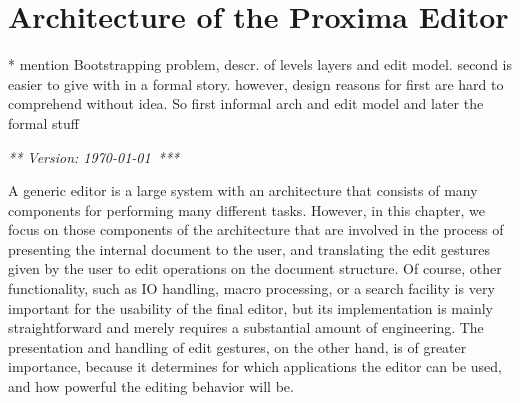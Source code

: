 \chapter{Architecture of the Proxima Editor}
\label{chap:proxArch}












* mention Bootstrapping problem, descr. of levels layers and edit model. second is easier to give with in a formal story. however, design reasons for first are hard to comprehend without idea. So first informal arch and edit model and later the formal stuff

{\em *** Version: \today~***}


A generic editor is a large system with an architecture that consists of many components for performing many different tasks. However, in this chapter, we focus on those components of the architecture that are involved in the process of presenting the internal document to the user, and translating the edit gestures given by the user to edit operations on the document structure. Of course, other functionality, such as IO handling, macro processing, or a search facility is very important for the usability of the final editor, but its implementation is mainly straightforward and merely requires a substantial amount of engineering.  The presentation and handling of edit gestures, on the other hand, is of greater importance, because it determines for which applications the editor can be used, and how powerful the editing behavior will be.

